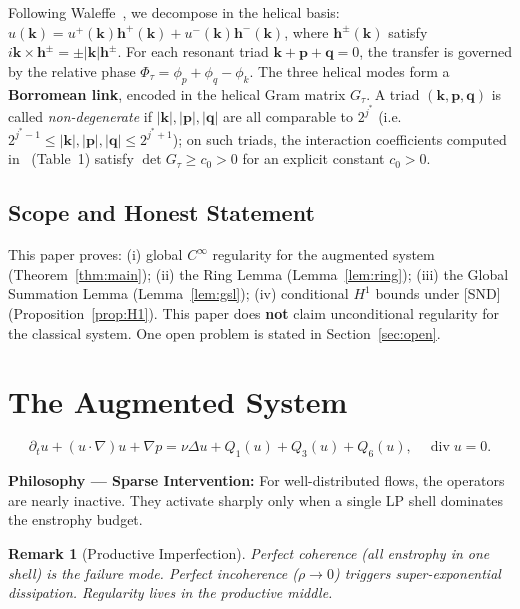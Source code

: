 \documentclass[11pt]{article}
\newtheorem{remark}[theorem]{Remark}
\begin{document}
Following Waleffe~\cite{Waleffe1992}, we decompose in the helical basis:
$\hat{u}(\mathbf{k}) = u^+(\mathbf{k})\mathbf{h}^+(\mathbf{k}) + u^-(\mathbf{k})\mathbf{h}^-(\mathbf{k})$,
where $\mathbf{h}^\pm(\mathbf{k})$ satisfy $i\mathbf{k}\times\mathbf{h}^\pm = \pm|\mathbf{k}|\mathbf{h}^\pm$.
For each resonant triad $\mathbf{k}+\mathbf{p}+\mathbf{q}=0$, the transfer is governed
by the relative phase $\Phi_\tau = \phi_p + \phi_q - \phi_k$.
The three helical modes form a \textbf{Borromean link}, encoded in the helical Gram matrix
$G_\tau$. A triad $(\mathbf{k},\mathbf{p},\mathbf{q})$ is called \emph{non-degenerate} if
$|\mathbf{k}|, |\mathbf{p}|, |\mathbf{q}|$ are all comparable to $2^{j^*}$
(i.e.\ $2^{j^*-1} \leq |\mathbf{k}|,|\mathbf{p}|,|\mathbf{q}| \leq 2^{j^*+1}$);
on such triads, the interaction coefficients computed in~\cite{Waleffe1992} (Table~1) satisfy
$\det G_\tau \geq c_0 > 0$ for an explicit constant $c_0 > 0$.

\subsection{Scope and Honest Statement}\label{sec:scope}

This paper proves: (i) global $C^\infty$ regularity for the augmented system
(Theorem~\ref{thm:main}); (ii) the Ring Lemma (Lemma~\ref{lem:ring});
(iii) the Global Summation Lemma (Lemma~\ref{lem:gsl});
(iv) conditional $H^1$ bounds under [SND] (Proposition~\ref{prop:H1}).
This paper does \textbf{not} claim unconditional regularity for the classical system.
One open problem is stated in Section~\ref{sec:open}.

\section{The Augmented System}

\[
\partial_t u + (u\cdot\nabla)u + \nabla p
= \nu\Delta u + Q_1(u) + Q_3(u) + Q_6(u),\quad \operatorname{div} u = 0.
\]

\textbf{Philosophy --- Sparse Intervention:} For well-distributed flows, the operators are
nearly inactive. They activate sharply only when a single LP shell dominates the enstrophy budget.

\begin{remark}[Productive Imperfection]
Perfect coherence (all enstrophy in one shell) is the failure mode. Perfect incoherence
($\rho\to 0$) triggers super-exponential dissipation. Regularity lives in the productive middle.
\end{remark}
\end{document}
